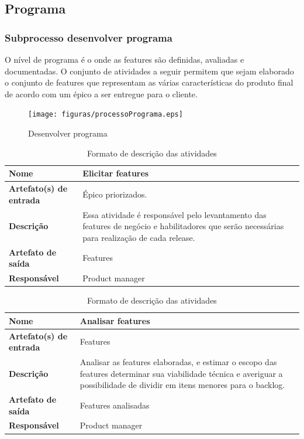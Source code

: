 \subsection{Programa}

\subsubsection{Subprocesso desenvolver programa}

O nível de programa é o onde as features são definidas, avaliadas e documentadas. O conjunto de atividades a seguir permitem que sejam elaborado o conjunto de features que representam as várias características do produto final de acordo com um épico a ser entregue para o cliente.

\begin{figure}[H]
    \centering
    \caption{Desenvolver programa}
    \label{processoPrograma}
    \texttt{[image: figuras/processoPrograma.eps]}
\end{figure}

\begin{table}[h]
    \centering
    \label{descricaoAtividades}
    \caption{Formato de descrição das atividades}
        \begin{tabular}{|l|p{10cm}|}
        \hline
        \textbf{Nome} & Elicitar features \\
        \hline
        \textbf{Artefato(s) de entrada} & Épico priorizados. \\
        \hline
        \textbf{Descrição} & Essa atividade é responsável pelo levantamento das features de negócio e habilitadores que serão necessárias para realização de cada release. \\
        \hline
        \textbf{Artefato de saída} & Features \\
        \hline
        \textbf{Responsável} & Product manager \\
        \hline
    \end{tabular}
\end{table}

\begin{table}[h]
    \centering
    \label{descricaoAtividades}
    \caption{Formato de descrição das atividades}
        \begin{tabular}{|l|p{10cm}|}
        \hline
        \textbf{Nome} & Analisar features \\
        \hline
        \textbf{Artefato(s) de entrada} & Features \\
        \hline
        \textbf{Descrição} & Analisar as features elaboradas, e estimar o escopo das features determinar sua viabilidade técnica e averiguar a possibilidade de dividir em itens menores para o backlog. \\
        \hline
        \textbf{Artefato de saída} & Features analisadas \\
        \hline
        \textbf{Responsável} & Product manager \\
        \hline
    \end{tabular}
\end{table}

